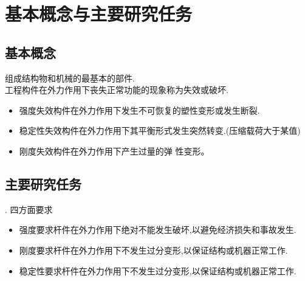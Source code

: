 \section{基本概念与主要研究任务}
\subsection{基本概念}
\vspace{1em}
组成结构物和机械的最基本的部件.\\[0.5em]
工程构件在外力作用下丧失正常功能的现象称为失效或破坏.
\begin{itemize}
	\item 强度失效\quad 构件在外力作用下发生不可恢复的塑性变形或发生断裂.
	\item 稳定性失效\quad 构件在外力作用下其平衡形式发生突然转变.(压缩载荷大于某值)
	\item 刚度失效\quad 构件在外力作用下产生过量的弹
	性变形。
	
\end{itemize}

\subsection{主要研究任务}
\vspace{1em}
. 四方面要求
\begin{itemize}
	\item 强度要求\quad 杆件在外力作用下绝对不能发生破坏,以避免经济损失和事故发生.
	\item 刚度要求\quad 杆件在外力作用下不发生过分变形,以保证结构或机器正常工作.
	\item 稳定性要求\quad 杆件在外力作用下不发生过分变形,以保证结构或机器正常工作.
\end{itemize}
